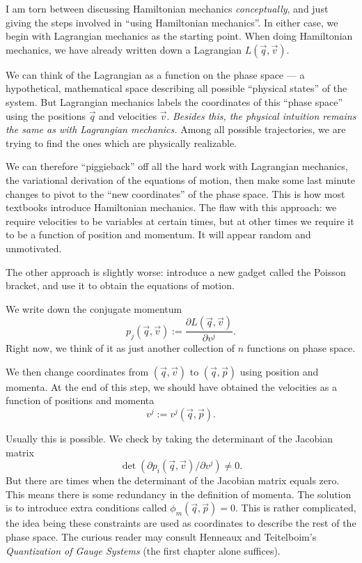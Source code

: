 \M
I am torn between discussing Hamiltonian mechanics \emph{conceptually},
and just giving the steps involved in ``using Hamiltonian mechanics''.
In either case, we begin with Lagrangian mechanics as the starting
point. When doing Hamiltonian mechanics, we have already written down a
Lagrangian $L(\vec{q},\vec{v})$.

We can think of the Lagrangian as a function on the phase space --- a
hypothetical, mathematical space describing all possible ``physical
states'' of the system. But Lagrangian mechanics labels the coordinates
of this ``phase space'' using the positions $\vec{q}$ and velocities $\vec{v}$.
\emph{Besides this, the physical intuition remains the same as with Lagrangian mechanics.}
Among all possible trajectories, we are trying to find the ones which
are physically realizable.

We can therefore ``piggieback'' off all the hard work with Lagrangian
mechanics, the variational derivation of the equations of motion, then
make some last minute changes to pivot to the ``new coordinates'' of the
phase space. This is how most textbooks introduce Hamiltonian mechanics.
The flaw with this approach: we require velocities to be variables at
certain times, but at other times we require it to be a function of
position and momentum. It will appear random and unmotivated.

The other approach is slightly worse: introduce a new gadget called the
Poisson bracket, and use it to obtain the equations of motion.

We write down the conjugate momentum
\begin{equation}
p_{j}(\vec{q},\vec{v}) := \frac{\partial L(\vec{q},\vec{v})}{\partial v^{j}}.
\end{equation}
Right now, we think of it as just another collection of $n$ functions on
phase space.

We then change coordinates from $(\vec{q},\vec{v})$ to
$(\vec{q},\vec{p})$ using position and momenta.
At the end of this step, we should have obtained the velocities as a
function of positions and momenta
\begin{equation}
v^{j} := v^{j}(\vec{q},\vec{p}).
\end{equation}

\begin{remark}
Usually this is
possible. We check by taking the determinant of the Jacobian matrix
\begin{equation}
\det(\partial p_{i}(\vec{q},\vec{v})/\partial v^{j})\neq0.
\end{equation}
But there are times when the determinant of the Jacobian matrix equals
zero. This means there is some redundancy in the definition of momenta.
The solution is to introduce extra conditions called 
$\phi_{m}(\vec{q},\vec{p})=0$. This is rather complicated, the idea
being these constraints are used as coordinates to describe the rest of
the phase space. The curious reader may consult Henneaux and
Teitelboim's \emph{Quantization of Gauge Systems} (the first chapter
alone suffices).
\end{remark}

